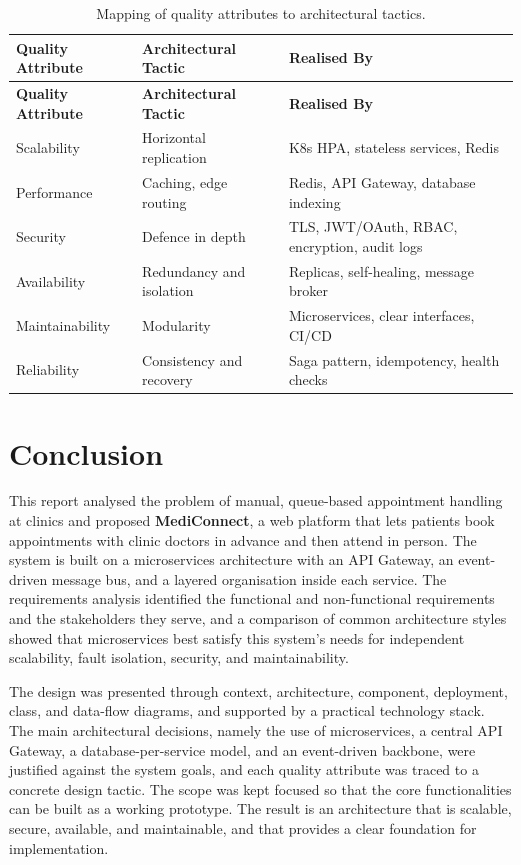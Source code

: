 \documentclass[12pt,a4paper]{article}
\begin{document}
\begin{longtable}{p{3.2cm} p{4.4cm} p{6.0cm}}
\caption{Mapping of quality attributes to architectural tactics.}\\
\toprule
\textbf{Quality Attribute} & \textbf{Architectural Tactic} & \textbf{Realised By}\\
\midrule
\endfirsthead
\toprule
\textbf{Quality Attribute} & \textbf{Architectural Tactic} & \textbf{Realised By}\\
\midrule
\endhead
Scalability & Horizontal replication & K8s HPA, stateless services, Redis\\
Performance & Caching, edge routing & Redis, API Gateway, database indexing\\
Security & Defence in depth & TLS, JWT/OAuth, RBAC, encryption, audit logs\\
Availability & Redundancy and isolation & Replicas, self-healing, message broker\\
Maintainability & Modularity & Microservices, clear interfaces, CI/CD\\
Reliability & Consistency and recovery & Saga pattern, idempotency, health checks\\
\bottomrule
\end{longtable}

\section{Conclusion}
This report analysed the problem of manual, queue-based appointment handling at clinics and
proposed \textbf{MediConnect}, a web platform that lets patients book appointments with clinic
doctors in advance and then attend in person. The system is built on a microservices
architecture with an API Gateway, an event-driven message bus, and a layered organisation inside
each service. The requirements analysis identified the functional and non-functional
requirements and the stakeholders they serve, and a comparison of common architecture styles
showed that microservices best satisfy this system's needs for independent scalability, fault
isolation, security, and maintainability.

The design was presented through context, architecture, component, deployment, class, and
data-flow diagrams, and supported by a practical technology stack. The main architectural
decisions, namely the use of microservices, a central API Gateway, a database-per-service model,
and an event-driven backbone, were justified against the system goals, and each quality attribute
was traced to a concrete design tactic. The scope was kept focused so that the core
functionalities can be built as a working prototype. The result is an architecture that is
scalable, secure, available, and maintainable, and that provides a clear foundation for
implementation.
\end{document}
